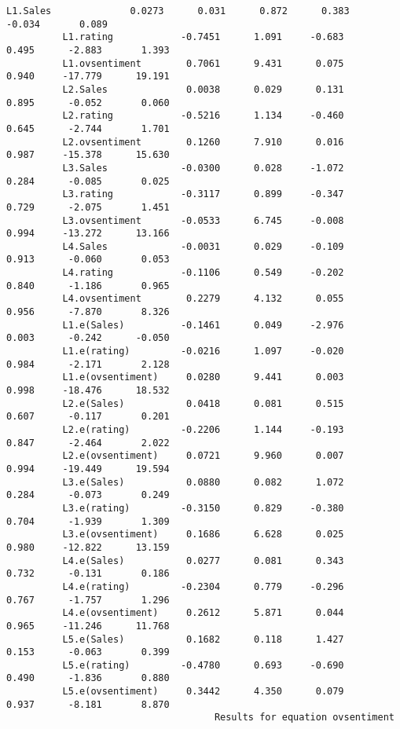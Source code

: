 \documentclass[11pt]{article}
\begin{document}
\begin{Verbatim}[commandchars=\\\{\}]
          L1.Sales              0.0273      0.031      0.872      0.383      -0.034       0.089
          L1.rating            -0.7451      1.091     -0.683      0.495      -2.883       1.393
          L1.ovsentiment        0.7061      9.431      0.075      0.940     -17.779      19.191
          L2.Sales              0.0038      0.029      0.131      0.895      -0.052       0.060
          L2.rating            -0.5216      1.134     -0.460      0.645      -2.744       1.701
          L2.ovsentiment        0.1260      7.910      0.016      0.987     -15.378      15.630
          L3.Sales             -0.0300      0.028     -1.072      0.284      -0.085       0.025
          L3.rating            -0.3117      0.899     -0.347      0.729      -2.075       1.451
          L3.ovsentiment       -0.0533      6.745     -0.008      0.994     -13.272      13.166
          L4.Sales             -0.0031      0.029     -0.109      0.913      -0.060       0.053
          L4.rating            -0.1106      0.549     -0.202      0.840      -1.186       0.965
          L4.ovsentiment        0.2279      4.132      0.055      0.956      -7.870       8.326
          L1.e(Sales)          -0.1461      0.049     -2.976      0.003      -0.242      -0.050
          L1.e(rating)         -0.0216      1.097     -0.020      0.984      -2.171       2.128
          L1.e(ovsentiment)     0.0280      9.441      0.003      0.998     -18.476      18.532
          L2.e(Sales)           0.0418      0.081      0.515      0.607      -0.117       0.201
          L2.e(rating)         -0.2206      1.144     -0.193      0.847      -2.464       2.022
          L2.e(ovsentiment)     0.0721      9.960      0.007      0.994     -19.449      19.594
          L3.e(Sales)           0.0880      0.082      1.072      0.284      -0.073       0.249
          L3.e(rating)         -0.3150      0.829     -0.380      0.704      -1.939       1.309
          L3.e(ovsentiment)     0.1686      6.628      0.025      0.980     -12.822      13.159
          L4.e(Sales)           0.0277      0.081      0.343      0.732      -0.131       0.186
          L4.e(rating)         -0.2304      0.779     -0.296      0.767      -1.757       1.296
          L4.e(ovsentiment)     0.2612      5.871      0.044      0.965     -11.246      11.768
          L5.e(Sales)           0.1682      0.118      1.427      0.153      -0.063       0.399
          L5.e(rating)         -0.4780      0.693     -0.690      0.490      -1.836       0.880
          L5.e(ovsentiment)     0.3442      4.350      0.079      0.937      -8.181       8.870
                                     Results for equation ovsentiment                          

\end{Verbatim}
\end{document}
